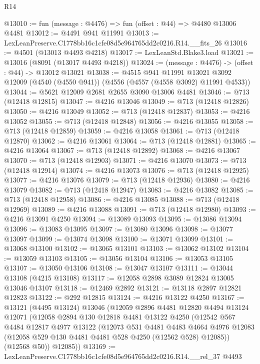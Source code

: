 \begin{lexlean}{R14}
\begin{coremodule}
@13010 := fun (message : @4476) => fun (offset : @44) => @4480 @13006 @4481
@13012 := @4491 @941 @11991
@13013 := LexLeanPreserve.C1778bb16c1cfe08d5e964765dd2c0216.R14.__fits_26
@13016 := @4501 (@13013 @4493 @4218)
@13017 := LexLeanStd.Blake3.load
@13021 := @13016 (@8091 (@13017 @4493 @4218))
@13024 := (message : @4476) -> (offset : @44) -> @13012 @13021
@13038 := @4515
    @941
    @11991
    @13021
    @3092
    @12009
    (@4540 (@4550 @941))
    (@4556 (@4557 (@4558 @3092) @11991 @4533))
@13044 := @5621 @12009 @2681 @2655 @3090 @13006 @4481
@13046 := @713 (@12418 @12815)
@13047 := @4216 @13046
@13049 := @713 (@12418 @12826)
@13050 := @4216 @13049
@13052 := @713 (@12418 @12837)
@13053 := @4216 @13052
@13055 := @713 (@12418 @12848)
@13056 := @4216 @13055
@13058 := @713 (@12418 @12859)
@13059 := @4216 @13058
@13061 := @713 (@12418 @12870)
@13062 := @4216 @13061
@13064 := @713 (@12418 @12881)
@13065 := @4216 @13064
@13067 := @713 (@12418 @12892)
@13068 := @4216 @13067
@13070 := @713 (@12418 @12903)
@13071 := @4216 @13070
@13073 := @713 (@12418 @12914)
@13074 := @4216 @13073
@13076 := @713 (@12418 @12925)
@13077 := @4216 @13076
@13079 := @713 (@12418 @12936)
@13080 := @4216 @13079
@13082 := @713 (@12418 @12947)
@13083 := @4216 @13082
@13085 := @713 (@12418 @12958)
@13086 := @4216 @13085
@13088 := @713 (@12418 @12969)
@13089 := @4216 @13088
@13091 := @713 (@12418 @12980)
@13093 := @4216 @13091 @4250
@13094 := @13089 @13093
@13095 := @13086 @13094
@13096 := @13083 @13095
@13097 := @13080 @13096
@13098 := @13077 @13097
@13099 := @13074 @13098
@13100 := @13071 @13099
@13101 := @13068 @13100
@13102 := @13065 @13101
@13103 := @13062 @13102
@13104 := @13059 @13103
@13105 := @13056 @13104
@13106 := @13053 @13105
@13107 := @13050 @13106
@13108 := @13047 @13107
@13111 := @13044 @13108 (@4215 @13108)
@13117 := @12058 @2898 @3089 @12824 @13005 @13046 @13107
@13118 := @12469 @2892
@13121 := @13118 @2897 @12821 @12823
@13122 := @292 @12815
@13124 := @4216 @13122 @4250
@13167 := @13121
    (@4495 @13124)
    @13046
    (@12059
      @2896
      @4481
      @12820
      @4494
      @13124
      @12071
      (@12058
        @2894
        @130
        @12818
        @4481
        @13122
        @4250
        (@12542
          @567
          @4484
          @12817
          @4977
          @13122
          (@12073
            @531
            @4481
            @4483
            @4664
            @4976
            @12083
            (@12058 @529 @130 @4481 @4481 @528 @4250 (@12562 @528) @12085))
          (@12568 @50))
        @12085))
@13169 := LexLeanPreserve.C1778bb16c1cfe08d5e964765dd2c0216.R14.__rel_37 @4493

\end{coremodule}
\end{lexlean}
